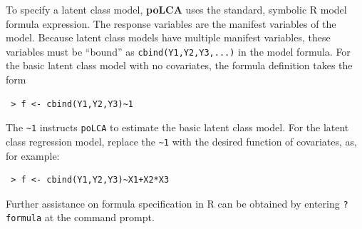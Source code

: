 \documentclass[letterpaper,12pt]{article}
\begin{document}
To specify a latent class model, \textbf{poLCA} uses the standard, symbolic \textsf{R} model formula expression. The response variables are the manifest variables of the model.  Because latent class models have multiple manifest variables, these variables must be ``bound'' as \texttt{cbind(Y1,Y2,Y3,...)} in the model formula. For the basic latent class model with no covariates, the formula definition takes the form
\begin{verbatim}
 > f <- cbind(Y1,Y2,Y3)~1
\end{verbatim}
The \verb"~1" instructs \texttt{poLCA} to estimate the basic latent class model. For the latent class regression model, replace the \verb"~1" with the desired function of covariates, as, for example:
\begin{verbatim}
 > f <- cbind(Y1,Y2,Y3)~X1+X2*X3
\end{verbatim}
Further assistance on formula specification in \textsf{R} can be obtained by entering \verb"?formula" at the command prompt.
\end{document}
